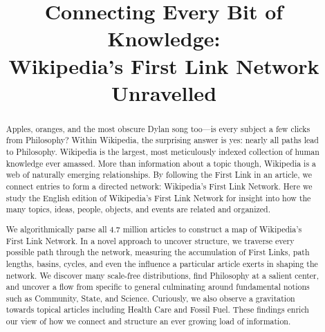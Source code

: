 \documentclass[pre,twocolumn,twoside,superscriptaddress,floatfix, aps, 10pt]{revtex4-1}
\begin{document}
\title{\protect
Connecting Every Bit of Knowledge: \\
Wikipedia's First Link Network Unravelled
}

\author{
}


\author{
}


\author{
}



\begin{abstract}
  \protect
Apples, oranges, and the most obscure Dylan song too---is every subject a few clicks from Philosophy? 
Within Wikipedia, the surprising answer is yes: nearly all 
paths lead to Philosophy.
Wikipedia is the largest, most meticulously indexed collection of human knowledge ever amassed. 
More than information about a topic though, Wikipedia is a web of naturally emerging relationships.  
By following the First Link in an article, we connect entries to form a directed network: Wikipedia's First Link Network. 
Here we study the English edition of Wikipedia's First Link Network for insight into how the many topics, ideas, people, objects, and events
are related and organized.  


We algorithmically parse all 4.7 million articles to construct a map of Wikipedia's First Link Network. 
In a novel approach to uncover structure, we traverse every possible path through the network, 
measuring the accumulation of First Links, path lengths, basins, cycles, and even the influence a particular article exerts in shaping the 
network.
We discover many scale-free distributions, find Philosophy at a salient center, and uncover a flow from specific to general 
culminating around fundamental notions such as Community, State, and Science. 
Curiously, we also observe a gravitation towards topical articles including Health Care and Fossil Fuel.
These findings enrich our view of how we connect and structure
an ever growing load of information.
 
\end{abstract}
\end{document}
